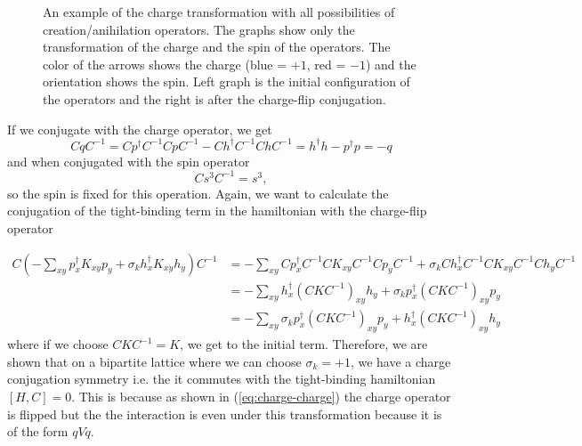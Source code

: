 \begin{figure}
\begin{center}
  \end{center}
  \caption{An example of the charge transformation with all possibilities of creation/anihilation operators. The graphs show only the transformation of the charge and the spin of the operators. The color of the arrows shows the charge (blue = $+1$, red = $-1$) and the orientation shows the spin. Left graph is the initial configuration of the operators and the right is after the charge-flip conjugation.}
  \label{fig:charge-flip}
\end{figure}
If we conjugate with the charge operator, we get
\begin{equation}
  CqC^{-1} = Cp^\dagger C^{-1}CpC^{-1} - Ch^\dagger C^{-1}ChC^{-1} = h^\dagger h - p^\dagger p = -q
  \label{eq:charge-charge}
\end{equation}
and when conjugated with the spin operator
\begin{equation}
  Cs^3C^{-1} = s^3,
\end{equation}
so the spin is fixed for this operation. Again, we want to calculate the conjugation of the tight-binding term in the hamiltonian with the charge-flip operator

\begin{align*}
  C\left( -\sum_{xy} p^\dagger_x K_{xy} p_y + \sigma_k h^\dagger_x K_{xy} h_y\right) C^{-1} &= -\sum_{xy} C p^\dagger_x C^{-1}C K_{xy} C^{-1}C p_y C^{-1} + \sigma_k C h^\dagger_x C^{-1}C K_{xy} C^{-1}C h_y C^{-1}
  \\
  &= -\sum_{xy}  h^\dagger_x (C K C^{-1})_{xy} h_y + \sigma_k p^\dagger_x (C K C^{-1})_{xy} p_y
  \\
  &= -\sum_{xy}  \sigma_k p^\dagger_x (C K C^{-1})_{xy} p_y + h^\dagger_x (C K C^{-1})_{xy} h_y
\end{align*}
where if we choose $CKC^{-1} = K$, we get to the initial term. Therefore, we are shown that on a bipartite lattice where we can choose $\sigma_k = +1$, we have a charge conjugation symmetry i.e. the it commutes with the tight-binding hamiltonian $[H,C] = 0$. This is because as shown in (\ref{eq:charge-charge}) the charge operator is flipped but the the interaction is even under this transformation because it is of the form $qVq$.


